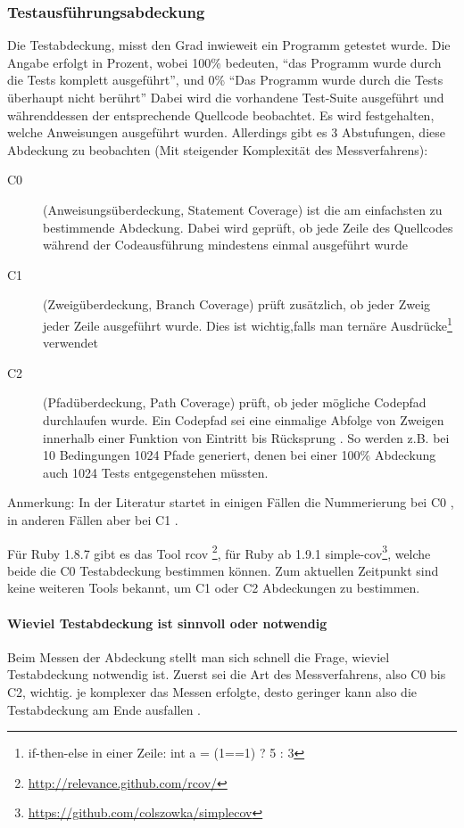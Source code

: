 \subsubsection{Testausführungsabdeckung}
Die Testabdeckung, misst den Grad inwieweit ein Programm getestet wurde. Die Angabe erfolgt in Prozent, wobei 100\% bedeuten, "`das Programm wurde durch die Tests komplett ausgeführt"', und 0\% "`Das Programm wurde durch die Tests überhaupt nicht berührt"' Dabei wird die vorhandene Test-Suite ausgeführt und währenddessen der entsprechende Quellcode beobachtet. Es wird festgehalten, welche Anweisungen ausgeführt wurden. Allerdings gibt es 3 Abstufungen, diese Abdeckung zu beobachten (Mit steigender Komplexität des Messverfahrens):
\begin{description}
 \item[C0] (Anweisungsüberdeckung, Statement Coverage) ist die am einfachsten zu bestimmende Abdeckung. Dabei wird geprüft, ob jede Zeile des Quellcodes während der Codeausführung mindestens einmal ausgeführt wurde
 \item[C1] (Zweigüberdeckung, Branch Coverage) prüft zusätzlich, ob jeder Zweig jeder Zeile ausgeführt wurde. Dies ist wichtig,falls man ternäre Ausdrücke\footnote{if-then-else in einer Zeile: int a = (1==1) ? 5 : 3} verwendet
 \item[C2] (Pfadüberdeckung, Path Coverage) prüft, ob jeder mögliche Codepfad durchlaufen wurde. Ein Codepfad sei eine einmalige Abfolge von Zweigen innerhalb einer Funktion von Eintritt bis Rücksprung \citep{steve_cornett_code_1996}. So werden z.B. bei 10 Bedingungen 1024 Pfade generiert, denen bei einer 100\% Abdeckung auch 1024 Tests entgegenstehen müssten.
 \end{description}
 Anmerkung: In der Literatur startet in einigen Fällen die Nummerierung bei C0 \citep{catherine_powell_abakas_2008}, in anderen Fällen aber bei C1 \citep{steve_cornett_code_1996}.

 Für Ruby 1.8.7 gibt es das Tool rcov \footnote{\url{http://relevance.github.com/rcov/}}, für Ruby ab 1.9.1 simple-cov\footnote{\url{https://github.com/colszowka/simplecov}}, welche beide die C0 Testabdeckung bestimmen können. Zum aktuellen Zeitpunkt sind keine weiteren Tools bekannt, um C1 oder C2 Abdeckungen zu bestimmen.
 \paragraph{Wieviel Testabdeckung ist sinnvoll oder notwendig}

 Beim Messen der Abdeckung stellt man sich schnell die Frage, wieviel Testabdeckung notwendig ist. Zuerst sei die Art des Messverfahrens, also C0 bis C2, wichtig. je komplexer das Messen erfolgte, desto geringer kann also die Testabdeckung am Ende ausfallen \citep{catherine_powell_abakas_2008}.

